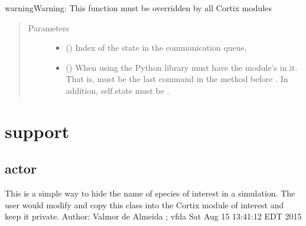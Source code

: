 \documentclass[letterpaper,10pt,openany,oneside,english]{sphinxmanual}
\begin{document}
\begin{fulllineitems}
\begin{fulllineitems}
\begin{sphinxadmonition}{warning}{Warning:}
This function must be overridden by all Cortix modules
\end{sphinxadmonition}
\begin{quote}\begin{description}
\item[{Parameters}] \leavevmode\begin{itemize}
\item {} 
\sphinxstyleliteralstrong{\sphinxupquote{{[}}}\sphinxstyleliteralstrong{\sphinxupquote{{]}}} () \textendash{} Index of the state in the communication queue.

\item {} 
\sphinxstyleliteralstrong{\sphinxupquote{{[}}}\sphinxstyleliteralstrong{\sphinxupquote{{]}}} () \textendash{} When using the Python  library  must have
the module’s  in it. That is,
 must be the last command in the
method before . In addition, self.state must be .

\end{itemize}

\end{description}\end{quote}

\end{fulllineitems}


\end{fulllineitems}



\chapter{support}
\label{\detokenize{support_rst/modules:support}}\label{\detokenize{support_rst/modules::doc}}

\section{actor}
\label{\detokenize{support_rst/actor:module-actor}}\label{\detokenize{support_rst/actor:actor}}\label{\detokenize{support_rst/actor::doc}}
This is a simple way to hide the name of species of interest in a simulation.
The user would modify and copy this class into the Cortix module of interest
and keep it private.
Author: Valmor de Almeida ; vfda
Sat Aug 15 13:41:12 EDT 2015
\end{document}
